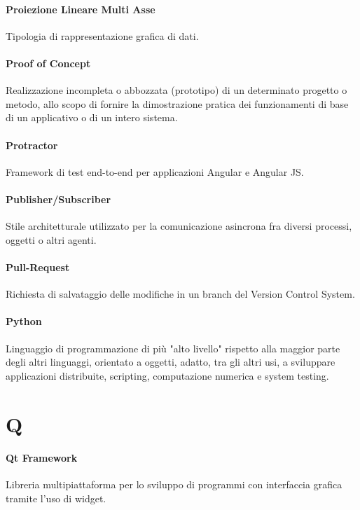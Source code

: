 \documentclass[]{article}
\begin{document}
	\paragraph*{Proiezione Lineare Multi Asse}
	Tipologia di rappresentazione grafica di dati.

	\paragraph*{Proof of Concept}
	Realizzazione incompleta o abbozzata (prototipo) di un determinato progetto o metodo, allo scopo di fornire la dimostrazione pratica dei funzionamenti di base di un applicativo o di un intero sistema.

	\paragraph*{Protractor}
	Framework di test end-to-end per applicazioni Angular e Angular JS.

	\paragraph*{Publisher/Subscriber}
	Stile architetturale utilizzato per la comunicazione asincrona fra diversi processi, oggetti o altri agenti.

	\paragraph*{Pull-Request}
	Richiesta di salvataggio delle modifiche in un branch del Version Control System.

	\paragraph*{Python}
	Linguaggio di programmazione di più "alto livello" rispetto alla maggior parte degli altri linguaggi, orientato a oggetti, adatto, tra gli altri usi, a sviluppare applicazioni distribuite, scripting, computazione numerica e system testing.

	\newpage

	\section*{Q}

	\paragraph*{Qt Framework}
	Libreria multipiattaforma per lo sviluppo di programmi con interfaccia grafica tramite l'uso di widget.
\end{document}
